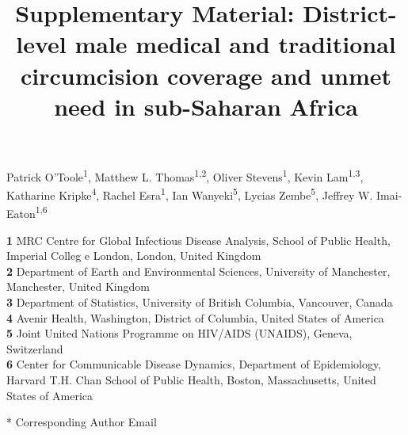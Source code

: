 \documentclass{article}
\title{Supplementary Material: District-level male medical and traditional circumcision coverage and unmet need in sub-Saharan Africa}
\author{}
\date{}
\begin{document}

\maketitle

\vspace{-1cm}

Patrick O'Toole\textsuperscript{1},
Matthew L. Thomas\textsuperscript{1,2},
Oliver Stevens\textsuperscript{1},
Kevin Lam\textsuperscript{1,3},
Katharine Kripke\textsuperscript{4},
Rachel Esra\textsuperscript{1},
Ian Wanyeki\textsuperscript{5},
Lycias Zembe\textsuperscript{5},
Jeffrey W. Imai-Eaton\textsuperscript{1,6} \\
\smallskip
  
\textbf{1} MRC Centre for Global Infectious Disease Analysis, School of Public Health, Imperial Colleg  e London, London, United Kingdom\\
\textbf{2} Department of Earth and Environmental Sciences, University of Manchester, Manchester, United Kingdom\\
\textbf{3} Department of Statistics, University of British Columbia, Vancouver, Canada\\
\textbf{4} Avenir Health, Washington, District of Columbia, United States of America\\
\textbf{5} Joint United Nations Programme on HIV/AIDS (UNAIDS), Geneva, Switzerland\\
\textbf{6} Center for Communicable Disease Dynamics, Department of Epidemiology, Harvard T.H. Chan School of Public Health, Boston, Massachusetts, United States of America\\

\smallskip

* Corresponding Author Email

\newpage

\end{document}
